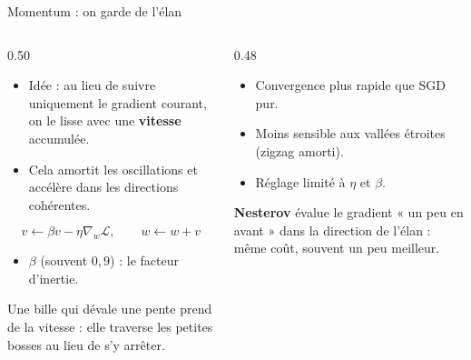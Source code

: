 \begin{frame}{Momentum : on garde de l'élan}
\begin{columns}[t]
\begin{column}{0.50\textwidth}
\begin{itemize}
  \item Idée : au lieu de suivre uniquement le gradient courant, on le lisse
  avec une \textbf{vitesse} accumulée.
  \item Cela amortit les oscillations et accélère dans les directions
  cohérentes.
\end{itemize}
\[
v \leftarrow \beta v - \eta \nabla_w \mathcal{L}, \qquad w \leftarrow w + v
\]
\begin{itemize}
  \item $\beta$ (souvent $0{,}9$) : le facteur d'inertie.
\end{itemize}
\begin{kbox}[Analogie]
Une bille qui dévale une pente prend de la vitesse : elle traverse les petites
bosses au lieu de s'y arrêter.
\end{kbox}
\end{column}
\begin{column}{0.48\textwidth}
\begin{ebox}
\begin{itemize}
  \item Convergence plus rapide que SGD pur.
  \item Moins sensible aux vallées étroites (zigzag amorti).
  \item Réglage limité à $\eta$ et $\beta$.
\end{itemize}
\end{ebox}
\begin{wbox}
\textbf{Nesterov} évalue le gradient « un peu en avant » dans la direction de
l'élan : même coût, souvent un peu meilleur.
\end{wbox}
\end{column}
\end{columns}
\end{frame}

